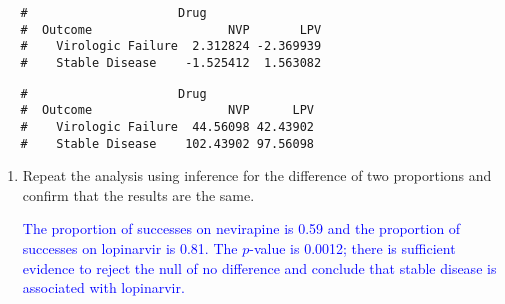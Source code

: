 \documentclass[letterpaper,12pt,twoside,]{pinp}
\begin{document}
\begin{enumerate}
\begin{enumerate}
    \color{black}
  \end{enumerate}

\begin{Shaded}
\begin{Highlighting}[]
\OperatorTok{$}
\end{Highlighting}
\end{Shaded}

  \begin{ShadedResult}
   \begin{verbatim}
   #                     Drug
   #  Outcome                   NVP       LPV
   #    Virologic Failure  2.312824 -2.369939
   #    Stable Disease    -1.525412  1.563082
   \end{verbatim}
   \end{ShadedResult}

\begin{Shaded}
\begin{Highlighting}[]
\OperatorTok{$}
\end{Highlighting}
\end{Shaded}

  \begin{ShadedResult}
   \begin{verbatim}
   #                     Drug
   #  Outcome                   NVP      LPV
   #    Virologic Failure  44.56098 42.43902
   #    Stable Disease    102.43902 97.56098
   \end{verbatim}
   \end{ShadedResult}

  \begin{enumerate}
  \def\labelenumii{\alph{enumii})}
  \setcounter{enumii}{7}
  \item
    Repeat the analysis using inference for the difference of two
    proportions and confirm that the results are the same.

    \textcolor{blue}{The proportion of successes on nevirapine is 0.59 and the proportion of successes on lopinarvir is 0.81. The $p$-value is 0.0012; there is sufficient evidence to reject the null of no difference and conclude that stable disease is associated with lopinarvir.}
  \end{enumerate}

\begin{Shaded}
\begin{Highlighting}[]
\NormalTok{(} \NormalTok{(}\NormalTok{, }\NormalTok{), } \NormalTok{(}\NormalTok{, }\NormalTok{))}
\end{Highlighting}
\end{Shaded}


\end{enumerate}
\end{document}
